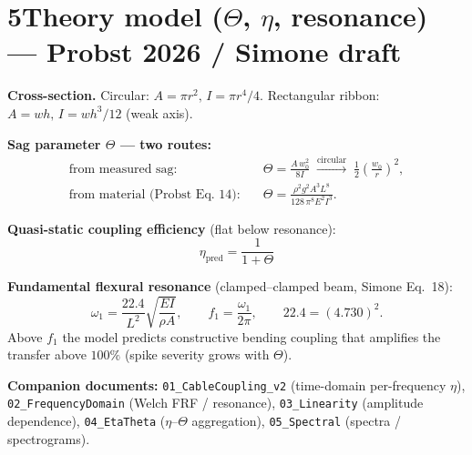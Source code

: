 \documentclass[11pt,a4paper]{article}
\begin{document}
\section*{5\quad Theory model ($\Theta$, $\eta$, resonance) --- Probst 2026 / Simone draft}
\textbf{Cross-section.} Circular: $A=\pi r^2,\,I=\pi r^4/4$. Rectangular ribbon: $A=wh,\,I=wh^3/12$ (weak axis).

\textbf{Sag parameter $\Theta$ --- two routes:}
\begin{align}
\text{from measured sag:}\quad &\Theta=\frac{A\,w_0^2}{8I}\;\xrightarrow{\text{circular}}\;\tfrac12\!\left(\frac{w_0}{r}\right)^2,\\
\text{from material (Probst Eq.~14):}\quad &\Theta=\frac{\rho^2 g^2 A^3 L^8}{128\,\pi^8 E^2 I^3}.
\end{align}

\textbf{Quasi-static coupling efficiency} (flat below resonance):
\begin{equation}
\boxed{\;\eta_{\mathrm{pred}}=\frac{1}{1+\Theta}\;}
\end{equation}

\textbf{Fundamental flexural resonance} (clamped--clamped beam, Simone Eq.~18):
\begin{equation}
\omega_1=\frac{22.4}{L^2}\sqrt{\frac{EI}{\rho A}},\qquad f_1=\frac{\omega_1}{2\pi},\qquad 22.4=(4.730)^2.
\end{equation}
Above $f_1$ the model predicts constructive bending coupling that amplifies the transfer above $100\%$ (spike severity grows with $\Theta$).

\vspace{0.6em}\footnotesize\noindent\textbf{Companion documents:}
\texttt{01\_CableCoupling\_v2} (time-domain per-frequency $\eta$),
\texttt{02\_FrequencyDomain} (Welch FRF / resonance),
\texttt{03\_Linearity} (amplitude dependence),
\texttt{04\_EtaTheta} ($\eta$--$\Theta$ aggregation),
\texttt{05\_Spectral} (spectra / spectrograms).
\end{document}
